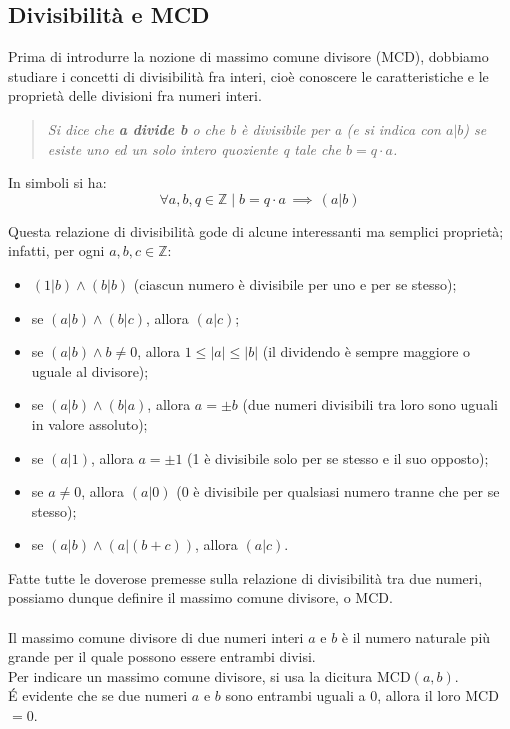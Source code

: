 \documentclass[a4paper,12pt]{article}
\begin{document}
\subsection{Divisibilità e MCD}
Prima di introdurre la nozione di massimo comune divisore (MCD), dobbiamo studiare i concetti di divisibilità fra interi, cioè conoscere le caratteristiche e le proprietà delle divisioni fra numeri interi.
\begin{quote}\label{divisioneIntera}
\emph{Si dice che \textbf{a divide b} o che b è divisibile per a (e si indica con $a|b$) se esiste uno ed un solo intero quoziente q tale che $b=q \cdot a$.}
\end{quote}
In simboli si ha:
\begin{equation}\label{divisibilita}
\forall a,b,q \in \mathbb{Z} \mid b=q \cdot a \, \implies \, (a|b)
\end{equation}

Questa relazione di divisibilità gode di alcune interessanti ma semplici proprietà; infatti, per ogni $a,b,c \in \mathbb{Z}$:
\begin{itemize}\label{proprietaDiv}
\item $(1|b) \land (b|b)$ (ciascun numero è divisibile per uno e per se stesso);
\item se $(a|b) \land (b|c)$, allora $(a|c)$;
\item se $(a|b) \land b\neq 0$, allora $1 \leq |a| \leq |b|$ (il dividendo è sempre maggiore o uguale al divisore);
\item se $(a|b) \land (b|a)$, allora $a = \pm b$ (due numeri divisibili tra loro sono uguali in valore assoluto);
\item se $(a|1)$, allora $a = \pm 1$ (1 è divisibile solo per se stesso e il suo opposto);
\item se $a \neq 0$, allora $(a|0)$ (0 è divisibile per qualsiasi numero tranne che per se stesso);
\item se $(a|b) \land (a|(b+c))$, allora $(a|c)$.
\end{itemize}

Fatte tutte le doverose premesse sulla relazione di divisibilità tra due numeri, possiamo dunque definire il massimo comune divisore, o MCD.\\\\
Il massimo comune divisore di due numeri interi $a$ e $b$ è il numero naturale più grande per il quale possono essere entrambi divisi.\\
Per indicare un massimo comune divisore, si usa la dicitura MCD$(a,b)$.\\
\'E evidente che se due numeri $a$ e $b$ sono entrambi uguali a $0$, allora il loro MCD $=0$.
\end{document}
